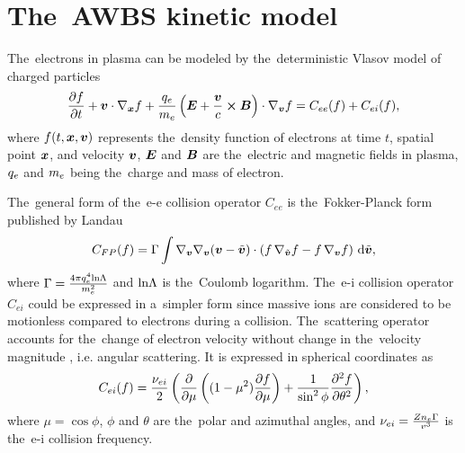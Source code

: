 \section{The~AWBS kinetic model}
\label{sec:AWBSmodel}

The~electrons in plasma can be modeled by the~deterministic Vlasov model 
of charged particles
\begin{equation}
  \frac{\partial{f}}{\partial{t}} + \boldsymbol{v}\cdot\nabla_{\boldsymbol{x}} f + 
  \frac{q_e}{m_e}\left(\boldsymbol{E} + \frac{\boldsymbol{v}}{c}\boldsymbol{\times}\boldsymbol{B}\right)\cdot\nabla_{\boldsymbol{v}} f = 
  C_{ee}(f) + C_{ei}(f) ,
  \label{eq:kinetic_equation}
\end{equation}
where $f(t, \boldsymbol{x}, \boldsymbol{v})$ represents the~density function of electrons
at time $t$, spatial point $\boldsymbol{x}$, and velocity $\boldsymbol{v}$, $\boldsymbol{E}$ and $\boldsymbol{B}$ are 
the~electric and magnetic fields in plasma, $q_e$ and $m_e$ being 
the~charge and mass of electron.

The~general form of the~e-e collision operator 
$C_{ee}$ is the~Fokker-Planck form published by Landau \cite{Landau_1936}
\begin{equation}
  C_{FP}(f) =
  \Gamma\int \nabla_{\boldsymbol{v}}\nabla_{\boldsymbol{v}}(\boldsymbol{v} - \tilde{\boldsymbol{v}}) \cdot \left(
  f\, \nabla_{\tilde{\boldsymbol{v}}} f - f\, \nabla_{\boldsymbol{v}} f \right)\, \text{d}\tilde{\boldsymbol{v}} ,
  \label{eq:LFP_model}
\end{equation}
where $\Gamma = \frac{4\pi q_e^4\text{ln}\Lambda}{m_e^2}$ and 
$\text{ln}\Lambda$ is the~Coulomb logarithm.
The~e-i collision operator $C_{ei}$ could be expressed
in a~simpler form since massive ions are considered 
to be motionless compared to electrons during a collision. 
The~scattering operator accounts
for the~change of electron velocity without change in the~velocity magnitude
, i.e. angular scattering. 
It is expressed in spherical coordinates as
\begin{equation}
  C_{ei}(f) = \frac{\nu_{ei}}{2}
  \left(\frac{\partial{}}{\partial{\mu}}\left((1 - \mu^2)\frac{\partial{f}}{\partial{\mu}}\right)
  + \frac{1}{\sin^2\phi}\frac{\partial^2 f}{\partial\theta^2} \right) ,
  \label{eq:ei_scattering}
\end{equation}
where $\mu = \cos\phi$, $\phi$ and $\theta$ are the~polar and azimuthal 
angles, and $\nu_{ei} = \frac{Z n_e \Gamma}{v^3}$ is the~e-i
collision frequency.

